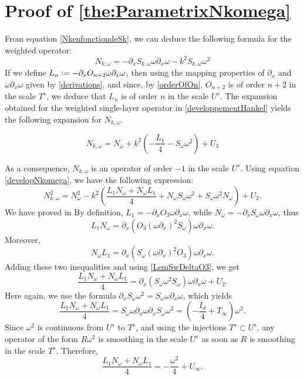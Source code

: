 \documentclass[a4paper]{article}
\begin{document}
\section{Proof of \autoref{the:ParametrixNkomega}}
\label{ParametrixNkomega}
From equation \eqref{NkenfonctiondeSk}, we can deduce the following formula for the weighted operator:
\begin{equation}
\label{developNkomega}
N_{k,\omega} = - \partial_x S_{k,\omega} \omega \partial_x \omega - k^2 S_{k,\omega} \omega^2
\end{equation}
If we define $L_n \mathrel{\mathop:}= - \partial_x O_{n+2} \omega \partial_x \omega$, then using the mapping properties of $\partial_x$ and $\omega\partial_x\omega$ given by \autoref{derivations}, and since, by \autoref{orderOfOn}, $O_{n+2}$ is of order $n+2$ in the scale $T^s$, we deduce that $L_n$ is of order $n$ in the scale $U^s$. 
The expansion obtained for the weighted single-layer operator in \autoref{developpementHankel} yields the following expansion for $N_{k,\omega}$. 
\begin{Lem}
	\[N_{k,\omega} = N_\omega + k^2 \left( -\frac{L_1}{4}- S_\omega \omega^2 \right) + U_3\]
\end{Lem}
\noindent As a consequence, $N_{k,\omega}$ is an operator of order $-1$ in the scale $U^s$. 
Using equation \eqref{developNkomega}, we have the following expression:
\[N_{k,\omega}^2 = N_\omega^2 - k^2\left( \frac{L_1 N_\omega + N_\omega L_1}{4} + N_\omega S_\omega \omega^2 + S_\omega \omega^2 N_\omega\right) + U_2.\]
We have proved in
By definition, $L_1 = -\partial_x O_3 \omega \partial_x \omega$, while $N_\omega = - \partial_x S_\omega \omega \partial_x \omega$, thus
\[L_1 N_\omega = \partial_x (O_3 (\omega \partial_x)^2 S_\omega ) \omega \partial_x \omega.\]
Moreover, 
\[N_\omega L_1 =  \partial_x (S_\omega (\omega \partial_x)^2 O_3  ) \omega \partial_x \omega.\]
Adding these two inequalities and using \autoref{LemSwDeltaO3}, we get 
\[\frac{L_1 N_\omega + N_\omega L_1}{4} =\partial_x ( S_\omega \omega^2 S_\omega ) \omega \partial_x \omega + U_2.\]
Here again, we use the formula $\partial_x S_\omega \omega^2 = S_\omega \omega \partial_x \omega$, which yields
\[\frac{L_1 N_\omega + N_\omega L_1}{4} = S_\omega \omega \partial_x \omega \partial_x S_\omega \omega^2 = \left(-\frac{I_d}{4} + T_\infty\right)\omega^2 .\]
Since $\omega^2$ is continuous from $U^s$ to $T^s$, and using the injections $T^s\subset U^s$, any operator of the form $R \omega^2$ is smoothing in the scale $U^s$ as soon as $R$ is smoothing in the scale $T^s$. Therefore, 
\[\frac{L_1 N_\omega + N_\omega L_1}{4} = -\frac{\omega^2}{4} + U_\infty.\]
\end{document}
